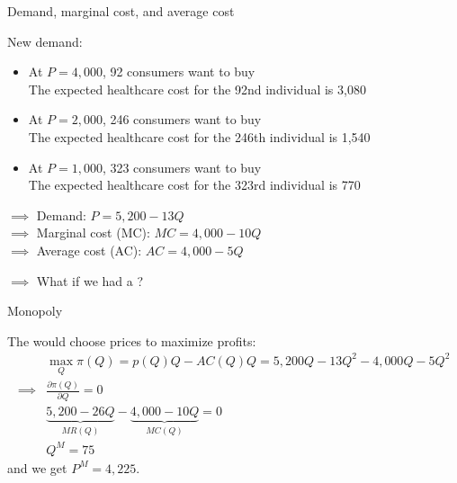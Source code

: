 \begin{frame}{Demand, marginal cost, and average cost}

    New demand:
    \begin{itemize}
        \item At $P=4,000$, 92 consumers want to buy\\
        {\color{blue} The expected healthcare cost for the 92nd individual is 3,080}
        \item At $P=2,000$, 246 consumers want to buy\\
        {\color{blue} The expected healthcare cost for the 246th individual is 1,540}
        \item At $P=1,000$, 323 consumers want to buy\\
        {\color{blue} The expected healthcare cost for the 323rd individual is 770}
    \end{itemize}
    $\implies$ Demand: $P = 5,200 - 13Q$\\
    $\implies$ Marginal cost (MC): $MC = 4,000 - 10Q$\\
    $\implies$ Average cost (AC): $AC = 4,000 - 5 Q$\\
    \vspace{3mm}

    $\implies$ What if we had a ?

\end{frame}
\begin{frame}{Monopoly}

    The  would choose prices to maximize profits:
    \begin{align*}
        &\max_Q \pi(Q) = p(Q)Q - AC(Q)Q = 5,200Q - 13Q^2 - 4,000Q - 5Q^2\\
        \implies &\frac{\partial \pi(Q)}{\partial Q} = 0\\
        &\underbrace{5,200 - 26Q}_{MR(Q)} - \underbrace{4,000 - 10 Q}_{MC(Q)} = 0\\
        &Q^{M} = 75
    \end{align*}
    and we get $P^{M} = 4,225$.\\

\end{frame}
